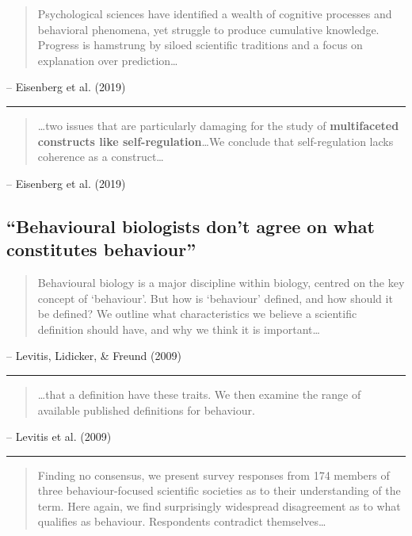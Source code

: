 \documentclass[
  letterpaper,
  DIV=11,
  numbers=noendperiod]{scrartcl}
\begin{document}
\begin{quote}
Psychological sciences have identified a wealth of cognitive processes
and behavioral phenomena, yet struggle to produce cumulative knowledge.
Progress is hamstrung by siloed scientific traditions and a focus on
explanation over prediction\ldots{}
\end{quote}

-- Eisenberg et al. (2019)

\begin{center}\rule{0.5\linewidth}{0.5pt}\end{center}

\begin{quote}
\ldots two issues that are particularly damaging for the study of
\textbf{multifaceted constructs like self-regulation}\ldots We conclude
that self-regulation lacks coherence as a construct\ldots{}
\end{quote}

-- Eisenberg et al. (2019)

\subsection{``Behavioural biologists don't agree on what constitutes
behaviour''}\label{behavioural-biologists-dont-agree-on-what-constitutes-behaviour}

\begin{quote}
Behavioural biology is a major discipline within biology, centred on the
key concept of `behaviour'. But how is `behaviour' defined, and how
should it be defined? We outline what characteristics we believe a
scientific definition should have, and why we think it is
important\ldots{}
\end{quote}

-- Levitis, Lidicker, \& Freund (2009)

\begin{center}\rule{0.5\linewidth}{0.5pt}\end{center}

\begin{quote}
\ldots that a definition have these traits. We then examine the range of
available published definitions for behaviour.
\end{quote}

-- Levitis et al. (2009)

\begin{center}\rule{0.5\linewidth}{0.5pt}\end{center}

\begin{quote}
Finding no consensus, we present survey responses from 174 members of
three behaviour-focused scientific societies as to their understanding
of the term. Here again, we find surprisingly widespread disagreement as
to what qualifies as behaviour. Respondents contradict
themselves\ldots{}
\end{quote}
\end{document}
